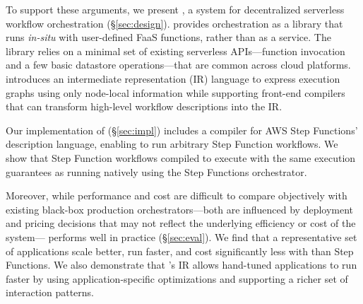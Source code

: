 To support these arguments, we present \name{}, a system for
decentralized serverless workflow
orchestration (\S\ref{sec:design}). \name{} provides orchestration as a
library that runs \emph{in-situ} with user-defined FaaS functions, rather than
as a  service. The library relies on a minimal set of
existing serverless APIs---function invocation and a few basic datastore
operations---that are common across cloud platforms. \name{} introduces an
intermediate representation (IR) language to express execution graphs using
only node-local information while supporting front-end compilers that can
transform high-level workflow descriptions into the IR.



Our implementation of \name{} (\S\ref{sec:impl}) includes a compiler for AWS
Step Functions' description language, enabling \name{} to run arbitrary Step
Function workflows. We show that Step Function workflows compiled to \name{}
execute with the same execution guarantees as running natively using the Step
Functions orchestrator.

Moreover, while performance and cost are difficult to compare objectively with
existing black-box production orchestrators---both are influenced by
deployment and pricing decisions that may not reflect the underlying
efficiency or cost of the system---\name{} performs well in practice
(\S\ref{sec:eval}). We find that a representative set of applications scale
better, run faster, and cost significantly less with \name{} than Step
Functions. We also demonstrate that \name{}'s IR allows hand-tuned
applications to run faster by using application-specific optimizations and
supporting a richer set of interaction patterns.
